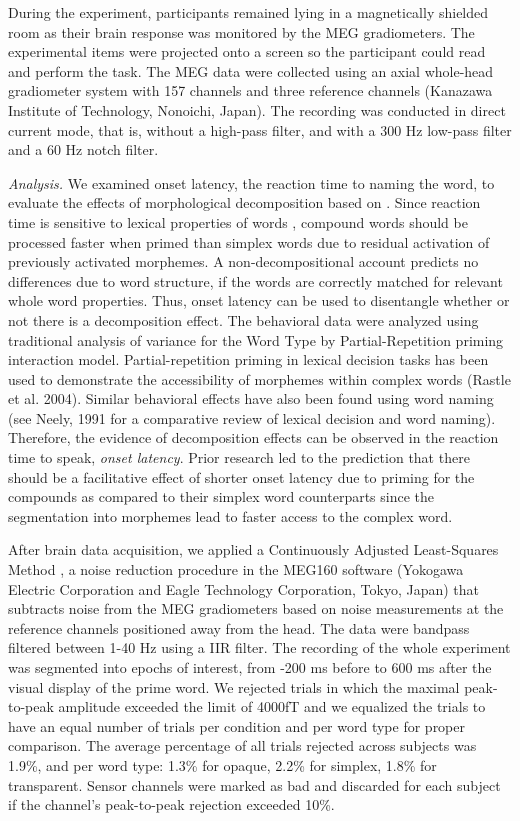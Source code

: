 \documentclass{frontiersSCNS}
\begin{document}
	During the experiment, participants remained lying in a magnetically shielded room as their brain response was monitored by the MEG gradiometers. The experimental items were projected onto a screen so the participant could read and perform the task. The MEG data were collected using an axial whole-head gradiometer system with 157 channels and three reference channels (Kanazawa Institute of Technology, Nonoichi, Japan).  The recording was conducted in direct current mode, that is, without a high-pass filter, and with a 300 Hz low-pass filter and a 60 Hz notch filter.

\textit{Analysis.} We examined onset latency, the reaction time to naming the word, to evaluate the effects of morphological decomposition based on \citet{Fiorentino:2007}. Since reaction time is sensitive to lexical properties of words \citep{Fiorentino:2007}, compound words should be processed faster when primed than simplex words due to residual activation of previously activated morphemes. A non-decompositional account predicts no differences due to word structure, if the words are correctly matched for relevant whole word properties. Thus, onset latency can be used to disentangle whether or not there is a decomposition effect. The behavioral data were analyzed using traditional analysis of variance for the Word Type by Partial-Repetition priming interaction model.
Partial-repetition priming in lexical decision tasks has been used to demonstrate the accessibility of morphemes within complex words (Rastle et al. 2004). Similar behavioral effects have also been found using word naming (see Neely, 1991 for a comparative review of lexical decision and word naming). Therefore, the evidence of decomposition effects can be observed in the reaction time to speak, \textit{onset latency}. Prior research led to the prediction that there should be a facilitative effect of shorter onset latency due to priming for the compounds as compared to their simplex word counterparts since the segmentation into morphemes lead to faster access to the complex word. 


After brain data acquisition, we applied a Continuously Adjusted Least-Squares Method \citep*{Adachi:2001}, a noise reduction procedure in the MEG160 software (Yokogawa Electric Corporation and Eagle Technology Corporation, Tokyo, Japan) that subtracts noise from the MEG gradiometers based on noise measurements at the reference channels positioned away from the head.  The data were bandpass filtered between 1-40 Hz using a IIR filter.  The recording of the whole experiment was segmented into epochs of interest, from -200 ms before to 600 ms after the visual display of the prime word.  We rejected trials in which the maximal peak-to-peak amplitude exceeded the limit of 4000fT and we equalized the trials to have an equal number of trials per condition and per word type for proper comparison. The average percentage of all trials rejected across subjects was 1.9\%, and per word type: 1.3\% for opaque, 2.2\% for simplex, 1.8\% for transparent. Sensor channels were marked as bad and discarded for each subject if the channel's peak-to-peak rejection exceeded 10\%. 
\end{document}
